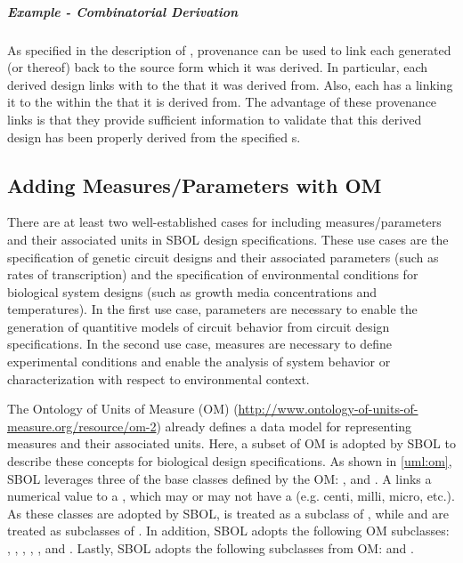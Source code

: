 \clearpage

\subparagraph{Example - Combinatorial Derivation}

As specified in the description of , provenance can be used to link each generated  (or  thereof) back to the source form which it was derived.
In particular, each derived design links with  to the  that it was derived from.  Also, each  has a  linking it to the  within the  that it is derived from.  The advantage of these provenance links is that they provide sufficient information to validate that this derived design has been properly derived from the specified s.

\subsection{Adding Measures/Parameters with OM}
\label{sec:parameters}

There are at least two well-established cases for including measures/parameters and their associated units in SBOL design specifications. These use cases are the specification of genetic circuit designs and their associated parameters (such as rates of transcription) and the specification of environmental conditions for biological system designs (such as growth media concentrations and temperatures). In the first use case, parameters are necessary to enable the generation of quantitive models of circuit behavior from circuit design specifications. In the second use case, measures are necessary to define experimental conditions and enable the analysis of system behavior or characterization with respect to environmental context.

The Ontology of Units of Measure (OM) (\url{http://www.ontology-of-units-of-measure.org/resource/om-2}) already defines a data model for representing measures and their associated units. Here, a subset of OM is adopted by SBOL to describe these concepts for biological design specifications. As shown in \ref{uml:om}, SBOL leverages three of the base classes defined by the OM: ,  and . A  links a numerical value to a , which may or may not have a  (e.g. centi, milli, micro, etc.). As these classes are adopted by SBOL,  is treated as a subclass of , while  and  are treated as subclasses of . In addition, SBOL adopts the following OM  subclasses: , , , , , and . Lastly, SBOL adopts the following  subclasses from OM:  and .

